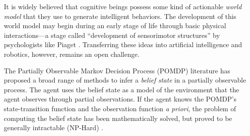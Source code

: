 \documentclass[runningheads]{llncs}
\begin{document}
It is widely believed that cognitive beings possess some kind of actionable \textit{world model} that they use to generate intelligent behaviors.
The development of this world model may begin during an early stage of life through basic physical inter\-actions---a stage called ``development of sensorimotor structures'' by psychologists like Piaget \cite[p. 104]{dolle_pour_2005}. 
Transferring these ideas into artificial intelligence and robotics, however,  remains an open challenge.



The Partially Observable Markov Decision Process (POMDP) literature has proposed a broad range of methods to infer a \textit{belief state} in a partially observable process.
The agent uses the belief state as a model of the environment that the agent observes through partial observations.  
If the agent knows the POMDP's state-transition function and the observation function \textit{a priori}, the problem of computing the belief state has been mathematically solved, but proved to be generally intractable (NP-Hard) \cite{astrom1965optimal}. 
\end{document}
